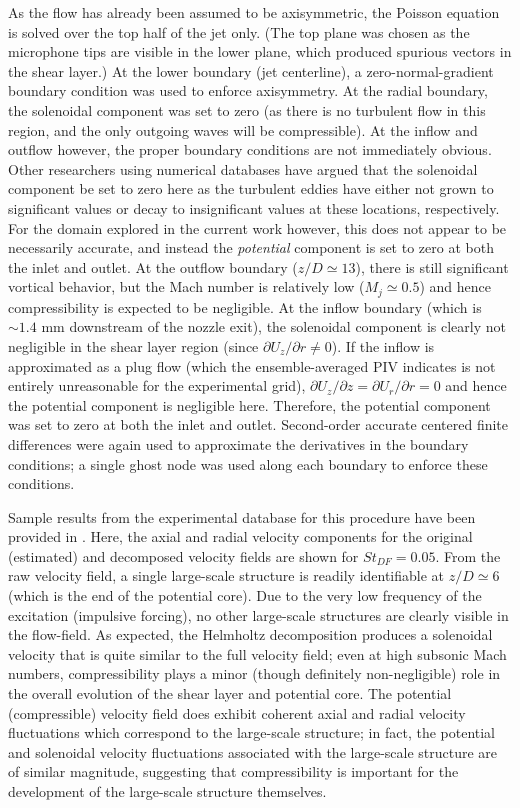 As the flow has already been assumed to be axisymmetric, the Poisson equation is solved over the top half of the jet only.
(The top plane was chosen as the microphone tips are visible in the lower plane, which produced spurious vectors in the shear layer.)
At the lower boundary (jet centerline), a zero-normal-gradient boundary condition was used to enforce axisymmetry.
At the radial boundary, the solenoidal component was set to zero (as there is no turbulent flow in this region, and the only outgoing waves will be compressible).
At the inflow and outflow however, the proper boundary conditions are not immediately obvious.
Other researchers using numerical databases \citep{Unnikrishnan2015} have argued that the solenoidal component be set to zero here as the turbulent eddies have either not grown to significant values or decay to insignificant values at these locations, respectively.
For the domain explored in the current work however, this does not appear to be necessarily accurate, and instead the \textit{potential} component is set to zero at both the inlet and outlet.
At the outflow boundary ($z/D \simeq 13$), there is still significant vortical behavior, but the Mach number is relatively low ($M_j \simeq 0.5$) and hence compressibility is expected to be negligible.
At the inflow boundary (which is $\sim1.4$ mm downstream of the nozzle exit), the solenoidal component is clearly not negligible in the shear layer region (since $\partial U_z / \partial r \neq 0$).
If the inflow is approximated as a plug flow (which the ensemble-averaged PIV indicates is not entirely unreasonable for the experimental grid), $\partial U_z / \partial z = \partial U_r / \partial r = 0$ and hence the potential component is negligible here.
Therefore, the potential component was set to zero at both the inlet and outlet.
Second-order accurate centered finite differences were again used to approximate the derivatives in the boundary conditions; a single ghost node was used along each boundary to enforce these conditions.

Sample results from the experimental database for this procedure have been provided in .
Here, the axial and radial velocity components for the original (estimated) and decomposed velocity fields are shown for $St_{DF}=0.05$.
From the raw velocity field, a single large-scale structure is readily identifiable at $z/D \simeq 6$ (which is the end of the potential core).
Due to the very low frequency of the excitation (impulsive forcing), no other large-scale structures are clearly visible in the flow-field.
As expected, the Helmholtz decomposition produces a solenoidal velocity that is quite similar to the full velocity field; even at high subsonic Mach numbers, compressibility plays a minor (though definitely non-negligible) role in the overall evolution of the shear layer and potential core.
The potential (compressible) velocity field does exhibit coherent axial and radial velocity fluctuations which correspond to the large-scale structure; in fact, the potential and solenoidal velocity fluctuations associated with the large-scale structure are of similar magnitude, suggesting that compressibility is important for the development of the large-scale structure themselves.

